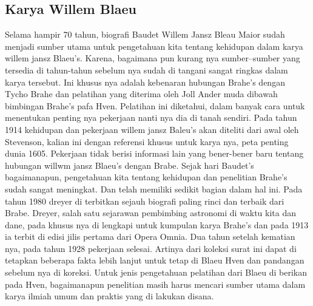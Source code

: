 \subsection{Karya Willem Blaeu}
Selama hampir 70 tahun, biografi Baudet Willem Jansz Bleau Maior sudah menjadi sumber utama untuk pengetahuan kita 
tentang kehidupan dalam karya willem jansz Blaeu's. Karena, bagaimana pun kurang nya sumber–sumber yang tersedia di tahun-tahun 
sebelum nya sudah di tangani sangat ringkas dalam karya tersebut. 
Ini khusus nya adalah kebenaran hubungan Brahe's dengan Tycho Brahe dan pelatihan yang diterima oleh Joll Ander muda dibawah bimbingan Brahe's pafa Hven. 
Pelatihan ini diketahui, dalam banyak cara untuk menentukan penting nya pekerjaan nanti nya dia di tanah sendiri. 
Pada tahun 1914 kehidupan dan pekerjaan willem jansz Baleu's akan diteliti dari awal oleh Stevenson, 
kalian ini dengan referensi khusus untuk karya nya, peta penting dunia 1605. Pekerjaan tidak berisi informasi lain yang bener-bener 
baru tentang hubungan willwm jansz Blaeu's dengan Brabe. Sejak hari Baudet's bagaimanapun, 
pengetahuan kita tentang kehidupan dan penelitian Brahe's sudah sangat meningkat. 
Dan telah memiliki sedikit bagian dalam hal ini. Pada tahun 1980 dreyer di terbitkan sejauh biografi paling rinci dan terbaik dari Brabe.  
Dreyer, salah satu sejarawan pembimbing astronomi di waktu kita dan dane, 
pada khusus nya di lengkapi untuk kumpulan karya Brahe's dan pada 1913 ia terbit di edisi jilis pertama dari Opera Omnia. 
Dua tahun setelah kematian nya, pada tahun 1928 pekerjaan selesai. 
Artinya dari koleksi surat ini dapat di tetapkan beberapa fakta lebih lanjut untuk tetap di Blaeu Hven dan pandangan sebelum nya di koreksi. 
Untuk jenis pengetahuan pelatihan dari Blaeu  di berikan pada Hven,
bagaimanapun penelitian masih harus mencari sumber utama dalam karya ilmiah umum dan praktis yang di lakukan disana. 

\cite{Richter1939Willem}


